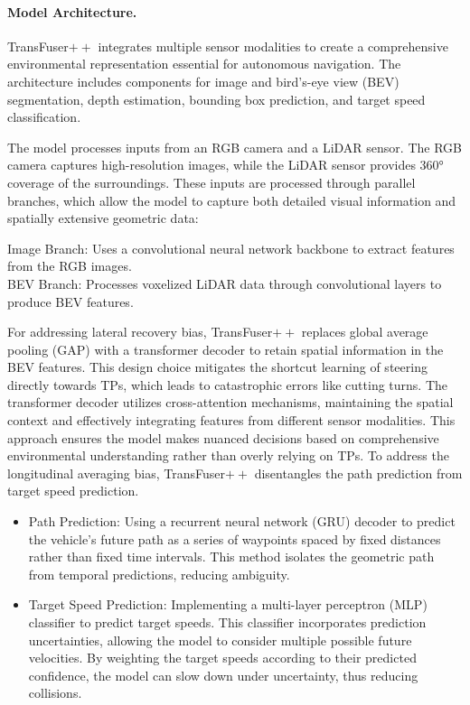 \paragraph{Model Architecture.}

TransFuser$++$ integrates multiple sensor modalities to create a comprehensive environmental representation essential for autonomous navigation. The architecture includes components for image and bird’s-eye view (BEV) segmentation, depth estimation, bounding box prediction, and target speed classification.

The model processes inputs from an RGB camera and a LiDAR sensor. The RGB camera captures high-resolution images, while the LiDAR sensor provides 360° coverage of the surroundings. These inputs are processed through parallel branches, which allow the model to capture both detailed visual information and spatially extensive geometric data:

Image Branch: Uses a convolutional neural network backbone to extract features from the RGB images.\\
BEV Branch: Processes voxelized LiDAR data through convolutional layers to produce BEV features.

For addressing lateral recovery bias, TransFuser$++$ replaces global average pooling (GAP) with a transformer decoder to retain spatial information in the BEV features. This design choice mitigates the shortcut learning of steering directly towards TPs, which leads to catastrophic errors like cutting turns. The transformer decoder utilizes cross-attention mechanisms, maintaining the spatial context and effectively integrating features from different sensor modalities. This approach ensures the model makes nuanced decisions based on comprehensive environmental understanding rather than overly relying on TPs. To address the longitudinal averaging bias, TransFuser$++$ disentangles the path prediction from target speed prediction. 

\begin {itemize}
	\item Path Prediction: Using a recurrent neural network (GRU) decoder to predict the vehicle’s future path as a series of waypoints spaced by fixed distances rather than fixed time intervals. This method isolates the geometric path from temporal predictions, reducing ambiguity.
	\item Target Speed Prediction: Implementing a multi-layer perceptron (MLP) classifier to predict target speeds. This classifier incorporates prediction uncertainties, allowing the model to consider multiple possible future velocities. By weighting the target speeds according to their predicted confidence, the model can slow down under uncertainty, thus reducing collisions.
\end{itemize}

